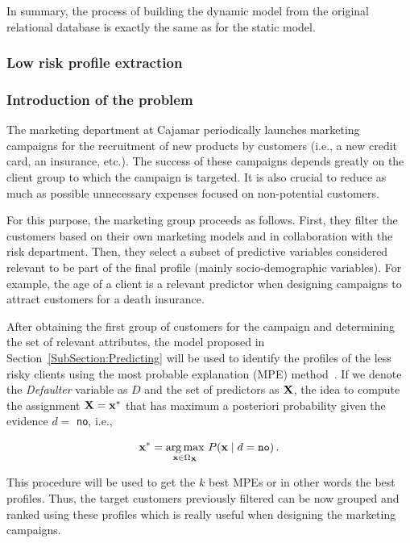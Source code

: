 In summary, the process of building the dynamic model from the original relational database is exactly the same as for the static model.

\subsubsection{Low risk profile extraction} \label{subsubsec:profileExtraction}

\subsubsection*{Introduction of the problem}

The marketing department at Cajamar periodically launches marketing campaigns for the recruitment of new products by customers (i.e., a new credit card, an insurance, etc.). The success of these campaigns depends greatly on the client group to which the campaign is targeted. It is also crucial to reduce as much as possible unnecessary expenses focused on non-potential customers. 

For this purpose, the marketing group proceeds as follows. First, they filter the customers based on their own marketing models and in collaboration with the risk department. Then, they select a subset of predictive variables considered relevant to be part of the final profile (mainly socio-demographic variables). For example, the age of a client is a relevant predictor when designing campaigns to attract customers for a death insurance. 

After obtaining the first group of customers for the campaign and determining the set of relevant attributes, the model proposed in Section~\ref{SubSection:Predicting} will be used to identify the profiles of the less risky clients using the most probable explanation (MPE) method~\cite{pearl1988probabilistic}. If we denote the \emph{Defaulter} variable as $D$ and  the set of predictors as $\mathbf{X}$, the idea to compute the assignment $\mathbf{X} = \mathbf{x}^{*}$ that has maximum a posteriori probability given the evidence $d=$ \texttt{no}, i.e., 

\begin{equation}
\mathbf{x}^{*} = \underset{\mathbf{x}\in\Omega_{\mathbf{X}}} {\mathrm{arg\,max}} ~ P(\mathbf{x}\mid d = \texttt{no})\, .
\label{eq:MPE}
\end{equation}

This procedure will be used to get the $k$ best MPEs or in other words the best profiles. Thus, the target customers previously filtered can be now grouped and ranked using these profiles which is really useful when designing the marketing campaigns.

